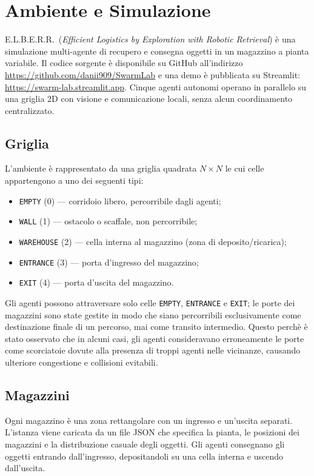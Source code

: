 \chapter{Ambiente e Simulazione}

\textsc{E.L.B.E.R.R.}\ (\textit{Efficient Logistics by Exploration with Robotic Retrieval}) \`e una
simulazione multi-agente di recupero e consegna oggetti in un magazzino a pianta variabile.
Il codice sorgente è disponibile su GitHub all'indirizzo \url{https://github.com/danii909/SwarmLab} e
una demo è pubblicata su Streamlit: \url{https://swarm-lab.streamlit.app}.
Cinque agenti autonomi operano in parallelo su una griglia 2D con visione e comunicazione
locali, senza alcun coordinamento centralizzato.

\section{Griglia}

L'ambiente \`e rappresentato da una griglia quadrata $N \times N$ le cui celle appartengono a
uno dei seguenti tipi:

\begin{itemize}
  \item \texttt{EMPTY} (0) --- corridoio libero, percorribile dagli agenti;
  \item \texttt{WALL} (1) --- ostacolo o scaffale, non percorribile;
  \item \texttt{WAREHOUSE} (2) --- cella interna al magazzino (zona di deposito/ricarica);
  \item \texttt{ENTRANCE} (3) --- porta d'ingresso del magazzino;
  \item \texttt{EXIT} (4) --- porta d'uscita del magazzino.
\end{itemize}

Gli agenti possono attraversare solo celle \texttt{EMPTY}, \texttt{ENTRANCE} e \texttt{EXIT};
le porte dei magazzini sono state gestite in modo che siano percorribili esclusivamente come destinazione finale di un percorso, mai come
transito intermedio. 
Questo perchè è stato osservato che in alcuni casi, gli agenti consideravano erroneamente le porte come scorciatoie dovute alla presenza di troppi agenti nelle vicinanze, causando ulteriore congestione e collisioni evitabili. 
\section{Magazzini}

Ogni magazzino \`e una zona rettangolare con un ingresso e un'uscita separati. L'istanza viene
caricata da un file JSON che specifica la pianta, le posizioni dei magazzini e la
distribuzione casuale degli oggetti. Gli agenti consegnano gli oggetti entrando
dall'ingresso, depositandoli su una cella interna e uscendo dall'uscita.


